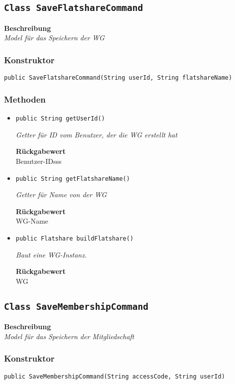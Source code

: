     \subsection{\texttt{Class SaveFlatshareCommand}}
    \textbf{Beschreibung} \\
    \textit{Model für das Speichern der WG}
    \subsubsection*{Konstruktor}
    \texttt{public SaveFlatshareCommand(String userId, String flatshareName)}
    \subsubsection*{Methoden}
    \begin{itemize}
    	\item{\texttt{public String getUserId()}}
    	
    	\textit{Getter für ID vom Benutzer, der die WG erstellt hat}
    	
    	
    	
    	\textbf{Rückgabewert} \\
    	Benutzer-IDsss        \item{\texttt{public String getFlatshareName()}}
    	
    	\textit{Getter für Name von der WG}
    	
    	
    	
    	\textbf{Rückgabewert} \\
    	WG-Name        \item{\texttt{public Flatshare buildFlatshare()}}
    	
    	\textit{Baut eine WG-Instanz.}
    	
    	
    	
    	\textbf{Rückgabewert} \\
    	WG
    \end{itemize}
    \subsection{\texttt{Class SaveMembershipCommand}}
    \textbf{Beschreibung} \\
    \textit{Model für das Speichern der Mitgliedschaft}
    \subsubsection*{Konstruktor}
    \texttt{public SaveMembershipCommand(String accessCode, String userId)}
